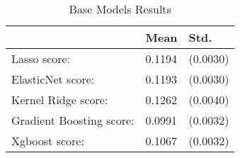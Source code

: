 \begin{table}[]
\small
\caption{Base Models Results} \label{tab:base_models}
\centering
\begin{tabular}{lll}
\hline
                         & Mean   & Std.     \\ \hline
Lasso score:             & 0.1194 & (0.0030) \\
ElasticNet score:        & 0.1193 & (0.0030) \\
Kernel Ridge score:      & 0.1262 & (0.0040) \\
Gradient Boosting score: & 0.0991 & (0.0032) \\
Xgboost score:           & 0.1067 & (0.0032) \\
\hline
\end{tabular}
\end{table}